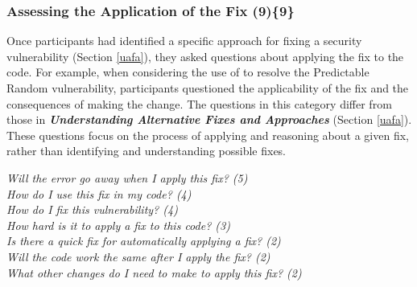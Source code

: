 \documentclass{acm_proc_article-sp}
\begin{document}



\subsubsection{\textbf{Assessing the Application of the Fix (9)\{9\}}}\label{aaf}
Once participants had identified a specific approach for fixing a security vulnerability (Section \ref{uafa}), they asked questions about applying the fix to the code.
For example, when considering the use of  to resolve the Predictable Random vulnerability, participants questioned the applicability of the fix and the consequences of making the change. 
The questions in this category differ from those in \emph{\textbf{Understanding Alternative Fixes and Approaches}} (Section \ref{uafa}). 
These questions focus on the process of applying  and reasoning about a given fix, rather than identifying and understanding possible fixes.


\noindent\emph{Will the error go away when I apply this fix? (5)} \\
\emph{How do I use this fix in my code? (4)} \\
\emph{How do I fix this vulnerability? (4)} \\
\emph{How hard is it to apply a fix to this code? (3)} \\
\emph{Is there a quick fix for automatically applying a fix? (2)} \\
\emph{Will the code work the same after I apply the fix? (2)} \\
\emph{What other changes do I need to make to apply this fix? (2)} 
\end{document}
